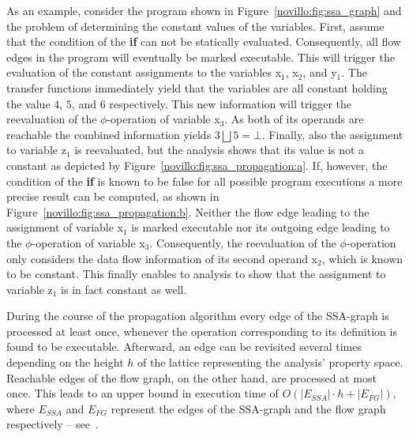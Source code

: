 As an example, consider the program shown in Figure~\ref{novillo:fig:ssa_graph}
and the problem of determining the constant values of the variables. First,
assume that the condition of the \textbf{if} can not be statically evaluated.
Consequently, all flow edges in the program will eventually be marked
executable. This will trigger the evaluation of the constant assignments to
the variables x$_1$,  x$_2$, and y$_1$. The transfer functions immediately yield
that the variables are all constant holding the value $4$, $5$, and $6$
respectively. This new information will trigger the reevaluation of the
$\phi$-operation of variable x$_3$. As both of its operands are reachable the
combined information yields $3 \bigsqcup 5 = \bot$. Finally, also the assignment
to variable z$_1$ is reevaluated, but the analysis shows that its value is not a
constant as depicted by Figure~\ref{novillo:fig:ssa_propagation:a}. If, however,
the condition of the \textbf{if} is known to be false for all possible program
executions a more precise result can be computed, as shown in
Figure~\ref{novillo:fig:ssa_propagation:b}. Neither the flow edge leading to the
assignment of variable x$_1$ is marked executable nor its outgoing edge leading
to the $\phi$-operation of variable x$_3$. Consequently, the reevaluation of
the $\phi$-operation only considers the data flow information of its second
operand x$_2$, which is known to be constant. This finally enables to analysis
to show that the assignment to variable z$_1$ is in fact constant as well.

During the course of the propagation algorithm every edge of the SSA-graph is
processed at least once, whenever the operation corresponding to its definition
is found to be executable. Afterward, an edge can be revisited several times
depending on the height $h$ of the lattice representing the analysis' property
space. Reachable edges of the flow graph, on the other hand, are processed at
most once. This leads to an upper bound in execution time of $O(|E_{SSA}| \cdot
h + |E_{FG}|)$, where $E_{SSA}$ and $E_{FG}$ represent the edges of the
SSA-graph and the flow graph respectively -- see~\cite{bib:wegman.ea-91}.

